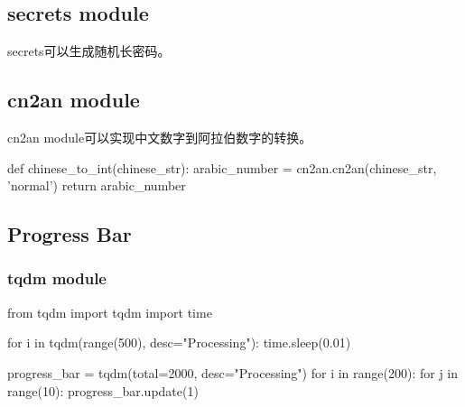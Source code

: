   \subsection{secrets module}
    secrets可以生成随机长密码。

  \subsection{cn2an module}
    cn2an module可以实现中文数字到阿拉伯数字的转换。
    \begin{codeblock}[language=python, caption={cn2an}]
      def chinese_to_int(chinese_str):
          arabic_number = cn2an.cn2an(chinese_str, 'normal')
          return arabic_number
    \end{codeblock}

  \subsection{Progress Bar}
    \subsubsection{tqdm module}
    \begin{codeblock}[language=python, caption={tqdm module}]
      from tqdm import tqdm
      import time

      for i in tqdm(range(500), desc="Processing"):
          time.sleep(0.01)

      progress_bar = tqdm(total=2000, desc="Processing")
      for i in range(200):
          for j in range(10):
              progress_bar.update(1)
    \end{codeblock}
